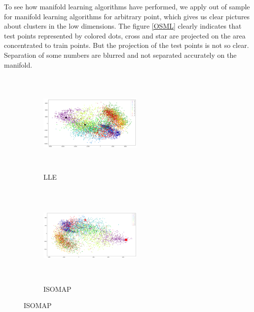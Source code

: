 To see how manifold learning algorithms have performed, we apply out of sample for manifold learning algorithms for arbitrary point, which gives us clear pictures about clusters in the low dimensions. The figure \ref{OSML} clearly indicates that test points represented by colored dots, cross and star are projected on the area concentrated to train points. But the projection of the test points is not so clear. Separation of some numbers are blurred and not separated accurately on the manifold.

\begin{figure}[t!] %
\begin{subfigure}{0.32\textwidth}
\includegraphics[height=5cm,width=5cm]{./Figures/LLE_OS.png}
\caption{LLE} 
\end{subfigure}\hspace*{\fill}
\begin{subfigure}{0.32\textwidth}
\includegraphics[height=5cm,width=5cm]{./Figures/ISO_OS.png}
\caption{ISOMAP} 
\end{subfigure}


\end{figure}
